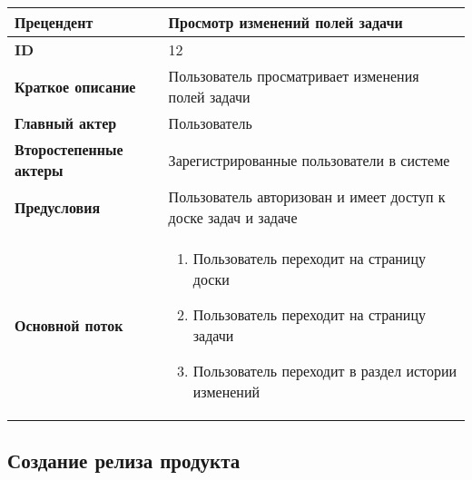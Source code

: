\documentclass[14pt,a4paper]{extarticle}
\begin{document}
\begin{tabular}{|l|p{9cm}|}
	\hline
	\textbf{Прецендент}            & Просмотр изменений полей задачи                                              \\
	\hline
	\textbf{ID}                    & 12                                                                           \\
	\hline
	\textbf{Краткое описание}      & Пользователь просматривает изменения полей задачи                	      \\
	\hline
	\textbf{Главный актер}         & Пользователь                                                                 \\
	\hline
	\textbf{Второстепенные актеры} & Зарегистрированные пользователи в системе                                    \\
	\hline
	\textbf{Предусловия}           & Пользователь авторизован и имеет доступ к доске задач и задаче               \\
	\hline
	\textbf{Основной поток}        & \begin{enumerate}
		                                 \item Пользователь переходит на страницу доски
		                                 \item Пользователь переходит на страницу задачи
						 \item Пользователь переходит в раздел истории изменений
	                                 \end{enumerate} \\
	\hline
\end{tabular}

\subsection{Создание релиза продукта}
\end{document}
